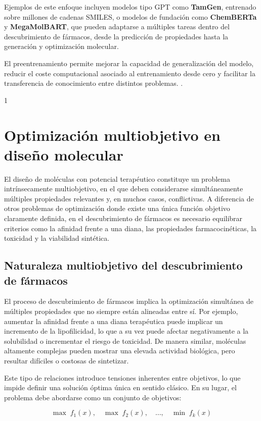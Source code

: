 \documentclass[IB]{TFUOC}%
\begin{document}
Ejemplos de este enfoque incluyen modelos tipo GPT como \textbf{TamGen}, entrenado sobre millones de cadenas SMILES, o modelos de fundación como \textbf{ChemBERTa} y \textbf{MegaMolBART}, que pueden adaptarse a múltiples tareas dentro del descubrimiento de fármacos, desde la predicción de propiedades hasta la generación y optimización molecular.

El preentrenamiento permite mejorar la capacidad de generalización del modelo, reducir el coste computacional asociado al entrenamiento desde cero y facilitar la transferencia de conocimiento entre distintos problemas. .

1\section{Optimización multiobjetivo en diseño molecular}

El diseño de moléculas con potencial terapéutico constituye un problema intrínsecamente multiobjetivo, en el que deben considerarse simultáneamente múltiples propiedades relevantes y, en muchos casos, conflictivas. A diferencia de otros problemas de optimización donde existe una única función objetivo claramente definida, en el descubrimiento de fármacos es necesario equilibrar criterios como la afinidad frente a una diana, las propiedades farmacocinéticas, la toxicidad y la viabilidad sintética.

\subsection{Naturaleza multiobjetivo del descubrimiento de fármacos}

El proceso de descubrimiento de fármacos implica la optimización simultánea de múltiples propiedades que no siempre están alineadas entre sí. Por ejemplo, aumentar la afinidad frente a una diana terapéutica puede implicar un incremento de la lipofilicidad, lo que a su vez puede afectar negativamente a la solubilidad o incrementar el riesgo de toxicidad. De manera similar, moléculas altamente complejas pueden mostrar una elevada actividad biológica, pero resultar difíciles o costosas de sintetizar.

Este tipo de relaciones introduce tensiones inherentes entre objetivos, lo que impide definir una solución óptima única en sentido clásico. En su lugar, el problema debe abordarse como un conjunto de objetivos:

\begin{equation}
\max \; f_1(x), \quad \max \; f_2(x), \quad \dots, \quad \min \; f_k(x)
\end{equation}
\end{document}
